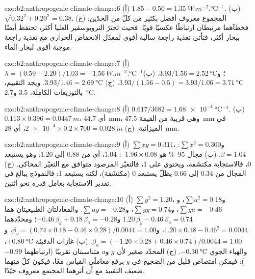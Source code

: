 \begin{solution}{exo:b2:anthropogenic-climate-change:6}
(أ) $1.85 - 0.50 = \qty{1.35}{W.m^{-2}.\celsius^{-1}}$. (ب) $\sqrt{0.32^2 + 0.20^2} = 0.38$.
(ج) المجموع معروف أفضل بكثير من كلّ من الحدّين: فخطآهما مرتبطان ارتباطًا عكسيًا قويًا. فحيث
تحترّ التروبوسفير العليا أكثر، تحتفظ أيضًا ببخار أكثر، فتأتي تغذية راجعة سالبة أقوى لمعدّل الانخفاض
الحراري مع تغذية راجعة موجبة أقوى لبخار الماء.
\end{solution}

\begin{solution}{exo:b2:anthropogenic-climate-change:7}
(أ) $\lambda = (0.59 - 2.20)/1.03 = \qty{-1.56}{W.m^{-2}.\celsius^{-1}}$؛ و$3.93/1.56 =
\qty{2.52}{\celsius}$. (ب) $3.93/(1.56 - 0.5) = 3.93/1.06 = \qty{3.71}{\celsius}$. (ج) $3.93/1.46 =
\qty{2.69}{\celsius}$. ويجد التقييم، بالتوزيعات الكاملة، 3.5 و\qty{2.7}{\celsius}.
\end{solution}

\begin{solution}{exo:b2:anthropogenic-climate-change:8}
(أ) $0.617/3682 = \qty{1.68e-4}{\celsius^{-1}}$. (ب) $0.113 \times 0.396 = \qty{0.0447}{m}$، أي
\qty{44.7}{mm}، وهي قريبة من القيمة \qty{47.5}{mm} في الميزانية. (ج) $\num{2e-4} \times 0.2 \times 700 =
\qty{0.028}{m}$، أي \qty{28}{mm}.
\end{solution}

\begin{solution}{exo:b2:anthropogenic-climate-change:9}
(أ) $\sum xy = 0.311$، و$\sum x^2 = 0.300$: $\beta = 1.04$. (ب) مجال \qty{95}{\percent} هو
$1.04 \pm 1.96 \times 0.08$، أي من 0.88 إلى 1.20: وهو يستبعد 0، فالاستجابة مكتشَفة، ويحتوي على
1، فالتغيّر المرصود متوافق مع التغيّر المحاكى. (ج) المجال من 0.34 إلى 0.66 يظلّ
يستبعد 0 (مكتشَفة)، لكنه يستبعد 1: فالنموذج يبالغ في تقدير الاستجابة بعامل قدره نحو
اثنين.
\end{solution}

\begin{solution}{exo:b2:anthropogenic-climate-change:10}
(أ) $\sum g^2 = 1.20$، و$\sum a^2 = 0.18$، و$\sum ga = -0.46$، و$\sum gy = 0.74$، و$\sum ay = -0.28$.
والمعادلتان الطبيعيتان هما $1.20\,\beta_g - 0.46\,\beta_a = 0.74$ و$-0.46\,\beta_g + 0.18\,\beta_a
= -0.28$؛ ومحدّدهما $1.20 \times 0.18 - 0.46^2 = 0.0044$، و$\beta_g = (0.74 \times
0.18 - 0.46 \times 0.28)/0.0044 = 1.00$، و$\beta_a = (-1.20 \times 0.28 + 0.46 \times 0.74)/0.0044 =
1.00$. (ب) غازات الدفيئة $+\qty{0.80}{\celsius}$، والهباء الجوي $-\qty{0.30}{\celsius}$. (ج) المحدّد
صغير لأن $g$ و$a$ متناسبتان تقريبًا (ارتباطهما $-0.99$): فيمكن امتصاص قليل
من الضجيج في $y$ برفع معاملَي القياس معًا، فيكون كلّ منهما ضعيف
التقييد مع أن أثرهما المجتمع معروف جيّدًا.
\end{solution}

